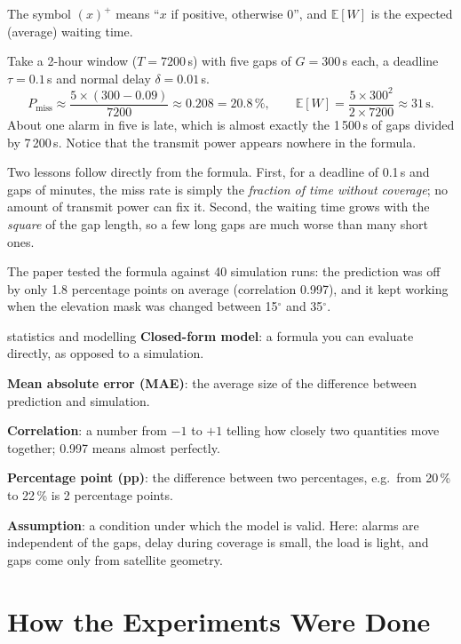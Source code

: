 \documentclass[11pt,a4paper]{article}
\newcommand{\kt}[1]{\textbf{\color{navy}#1}}
\begin{document}
The symbol $(x)^+$ means ``$x$ if positive, otherwise 0'', and $\mathbb{E}[W]$ is the expected (average) waiting time.

\begin{example}
Take a 2-hour window ($T = 7200$\,s) with five gaps of $G = 300$\,s each, a deadline $\tau = 0.1$\,s and normal delay $\delta = 0.01$\,s.
\[
P_\text{miss} \approx \frac{5\times(300-0.09)}{7200} \approx 0.208 = 20.8\,\%,\qquad
\mathbb{E}[W] = \frac{5\times300^2}{2\times7200} \approx 31\,\text{s}.
\]
About one alarm in five is late, which is almost exactly the 1\,500\,s of gaps divided by 7\,200\,s. Notice that the transmit power appears nowhere in the formula.
\end{example}

Two lessons follow directly from the formula. First, for a deadline of 0.1\,s and gaps of minutes, the miss rate is simply the \emph{fraction of time without coverage}; no amount of transmit power can fix it. Second, the waiting time grows with the \emph{square} of the gap length, so a few long gaps are much worse than many short ones.

The paper tested the formula against 40 simulation runs: the prediction was off by only 1.8 percentage points on average (correlation 0.997), and it kept working when the elevation mask was changed between 15$^\circ$ and 35$^\circ$.

\begin{term}{statistics and modelling}
\kt{Closed-form model}: a formula you can evaluate directly, as opposed to a simulation.\par
\kt{Mean absolute error (MAE)}: the average size of the difference between prediction and simulation.\par
\kt{Correlation}: a number from $-1$ to $+1$ telling how closely two quantities move together; 0.997 means almost perfectly.\par
\kt{Percentage point (pp)}: the difference between two percentages, e.g.\ from 20\,\% to 22\,\% is 2 percentage points.\par
\kt{Assumption}: a condition under which the model is valid. Here: alarms are independent of the gaps, delay during coverage is small, the load is light, and gaps come only from satellite geometry.
\end{term}

\section{How the Experiments Were Done}
\end{document}
